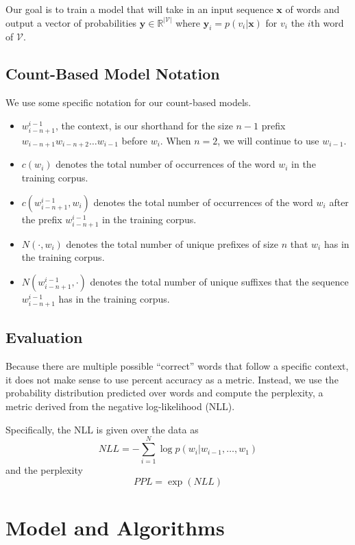 \documentclass[11pt]{article}
\begin{document}
Our goal is to train a model that will take in an input sequence $\mathbf{x}$ of words and output a vector of probabilities $\mathbf{y} \in \mathbb{R}^{|\mathcal{V}|}$ where $\mathbf{y}_i = p(v_i | \mathbf{x})$ for $v_i$ the $i$th word of $\mathcal{V}$.

\subsection{Count-Based Model Notation}

We use some specific notation for our count-based models. 
\begin{itemize}
  \item $w^{i-1}_{i-n+1}$, the context, is our shorthand for the size $n-1$ prefix $w_{i-n+1}w_{i-n+2}\dots w_{i-1}$ before $w_i$. When $n = 2$, we will continue to use $w_{i-1}$. 
  \item $c(w_i)$ denotes the total number of occurrences of the word $w_i$ in the training corpus. 
  \item $c(w^{i-1}_{i-n+1}, w_i)$ denotes the total number of occurrences of the word $w_i$ after the prefix $w^{i-1}_{i-n+1}$ in the training corpus. 
  \item $N(\cdot, w_i)$ denotes the total number of unique prefixes of size $n$ that $w_i$ has in the training corpus. 
  \item $N(w^{i-1}_{i-n+1}, \cdot)$ denotes the total number of unique suffixes that the sequence $w^{i-1}_{i-n+1}$ has in the training corpus. 
\end{itemize}

\subsection{Evaluation}

Because there are multiple possible ``correct'' words that follow a specific context, it does not make sense to use percent accuracy as a metric. Instead, we use the probability distribution predicted over words and compute the perplexity, a metric derived from the negative log-likelihood (NLL).

Specifically, the NLL is given over the data as
$$NLL = -\sum_{i=1}^N \log p(w_i | w_{i-1}, \ldots, w_1)$$
and the perplexity
$$PPL = \exp(NLL)$$

\section{Model and Algorithms}
\end{document}
